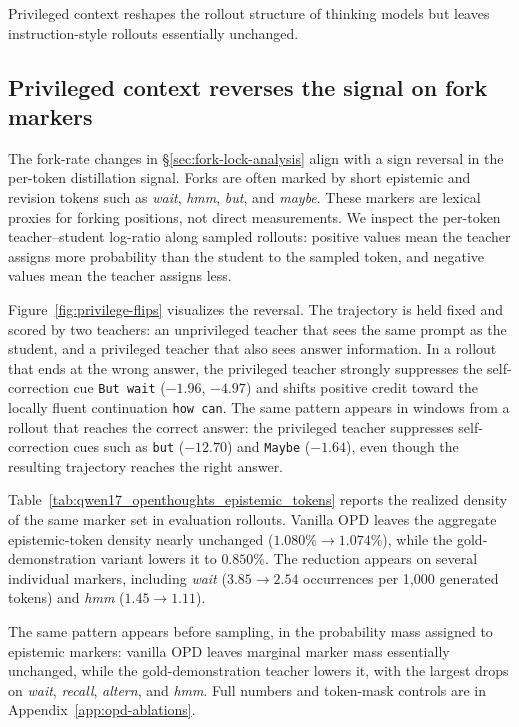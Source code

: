 Privileged context reshapes the rollout structure of thinking models but leaves
instruction-style rollouts essentially unchanged.

\subsection{Privileged context reverses the signal on fork markers}
\label{sec:token-signal-analysis}

The fork-rate changes in \S\ref{sec:fork-lock-analysis} align with a sign
reversal in the per-token distillation signal. Forks are often marked by short
epistemic and revision tokens such as \textit{wait}, \textit{hmm},
\textit{but}, and \textit{maybe}. These markers are lexical proxies for forking
positions, not direct measurements. We inspect the per-token teacher--student
log-ratio along sampled rollouts: positive values mean the teacher assigns more
probability than the student to the sampled token, and negative values mean the
teacher assigns less.



Figure~\ref{fig:privilege-flips} visualizes the reversal. The trajectory is held
fixed and scored by two teachers: an unprivileged teacher that sees the same
prompt as the student, and a privileged teacher that also sees answer
information. In a rollout that ends at the wrong answer, the privileged teacher
strongly suppresses the self-correction cue \texttt{But wait} ($-1.96$,
$-4.97$) and shifts positive credit toward the locally fluent continuation
\texttt{how can}. The same pattern appears in windows from a rollout that
reaches the correct answer: the privileged teacher suppresses self-correction
cues such as \texttt{but} ($-12.70$) and \texttt{Maybe} ($-1.64$), even though
the resulting trajectory reaches the right answer.



Table~\ref{tab:qwen17_openthoughts_epistemic_tokens} reports the realized
density of the same marker set in \qwenonesevenb{} evaluation rollouts. Vanilla
OPD leaves the aggregate epistemic-token density nearly unchanged
($1.080\% \to 1.074\%$), while the gold-demonstration variant lowers it to $0.850\%$.
The reduction appears on several individual markers, including \textit{wait}
($3.85 \to 2.54$ occurrences per 1,000 generated tokens) and \textit{hmm}
($1.45 \to 1.11$).

The same pattern appears before sampling, in the probability mass assigned to
epistemic markers: vanilla OPD leaves marginal marker mass essentially
unchanged, while the gold-demonstration teacher lowers it, with the largest
drops on \textit{wait}, \textit{recall}, \textit{altern}, and \textit{hmm}.
Full numbers and token-mask controls are in Appendix~\ref{app:opd-ablations}.


